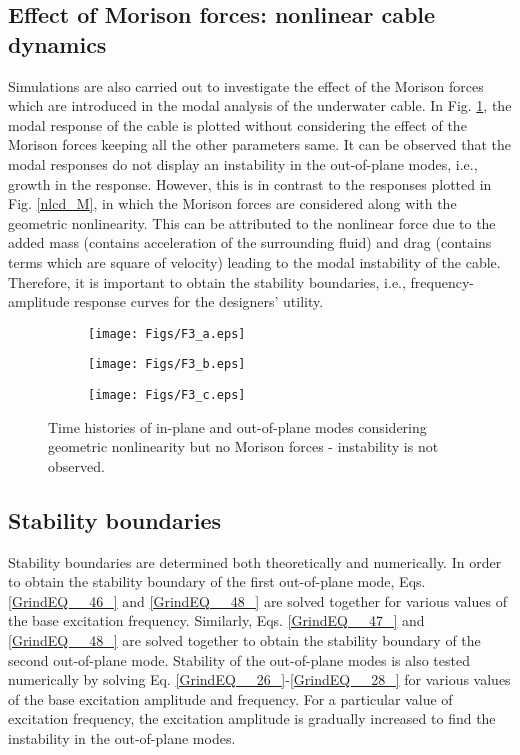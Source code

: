 \documentclass[review]{elsarticle}
\begin{document}
\subsection{Effect of Morison forces:  nonlinear cable dynamics}
Simulations are also carried out to investigate the effect of the Morison forces which are introduced in the modal analysis of the underwater cable.  In Fig. \ref{nlcd_noM}, the modal response of the cable is plotted without considering the effect of the Morison forces keeping all the other parameters same. It can be observed that the modal responses do not display an instability in the out-of-plane modes, i.e., growth in the response. However, this is in contrast to the responses plotted in Fig. \ref{nlcd_M}, in which the Morison forces are considered along with the geometric nonlinearity. This can be attributed to the nonlinear force due to the added mass (contains acceleration of the surrounding fluid) and drag (contains terms which are square of velocity) leading to the modal instability of the cable. Therefore, it is important to obtain the stability boundaries, i.e., frequency-amplitude response curves for the designers' utility.
\begin{figure}
	\centering
	\begin{subfigure}{1.0\textwidth}
		\centering
		\texttt{[image: Figs/F3\_a.eps]}
		\caption{}
	\end{subfigure}
	\begin{subfigure}{1.0\textwidth}
		\centering
		\texttt{[image: Figs/F3\_b.eps]}
		\caption{}
	\end{subfigure}
	\begin{subfigure}{1.0\textwidth}
		\centering
		\texttt{[image: Figs/F3\_c.eps]}
		\caption{}
	\end{subfigure}
	\caption{Time histories of in-plane and out-of-plane modes considering geometric nonlinearity but no Morison forces -  instability is not observed.}
	\label{nlcd_noM}
\end{figure}
\subsection{Stability boundaries}
Stability boundaries are determined both theoretically and numerically. In order to obtain the stability boundary of the first out-of-plane mode, Eqs. \eqref{GrindEQ__46_} and \eqref{GrindEQ__48_} are solved together for various values of the base excitation frequency. Similarly, Eqs. \eqref{GrindEQ__47_} and \eqref{GrindEQ__48_} are solved together to obtain the stability boundary of the second out-of-plane mode. Stability of the out-of-plane modes is also tested numerically by solving Eq. \eqref{GrindEQ__26_}-\eqref{GrindEQ__28_} for  various values of the base excitation amplitude and frequency. For a particular value of excitation frequency, the excitation amplitude is gradually increased to find the instability in the out-of-plane modes.
\end{document}
